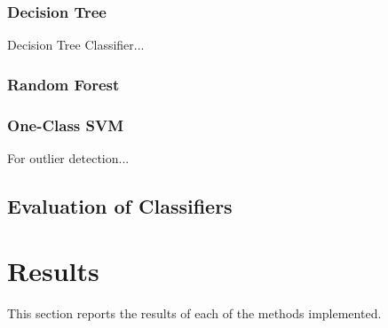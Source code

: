 \documentclass[12pt,a4paper]{article}
\numberwithin{figure}{section}
\numberwithin{table}{section}
\numberwithin{definition}{section}
\begin{document}

\subsubsection{Decision Tree}
\label{ssec:decisiontree}

Decision Tree Classifier...

\subsubsection{Random Forest}
\label{sec:randomforest}


\subsubsection{One-Class SVM}
\label{ssec:oneclasssvm}


For outlier detection...

\subsection{Evaluation of Classifiers}


\newpage
\section{Results}
\label{sec:results}

This section reports the results of each of the methods implemented.
\end{document}
